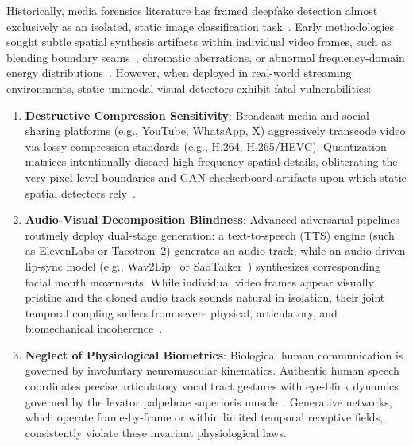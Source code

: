 \documentclass[journal]{IEEEtran}
\begin{document}
Historically, media forensics literature has framed deepfake detection almost exclusively as an isolated, static image classification task~\cite{afchar2018mesonet, chollet2017xception}. Early methodologies sought subtle spatial synthesis artifacts within individual video frames, such as blending boundary seams~\cite{chen2024npr}, chromatic aberrations, or abnormal frequency-domain energy distributions~\cite{frank2020leveraging, durall2020watch}. However, when deployed in real-world streaming environments, static unimodal visual detectors exhibit fatal vulnerabilities:
\begin{enumerate}
    \item \textbf{Destructive Compression Sensitivity}: Broadcast media and social sharing platforms (e.g., YouTube, WhatsApp, X) aggressively transcode video via lossy compression standards (e.g., H.264, H.265/HEVC). Quantization matrices intentionally discard high-frequency spatial details, obliterating the very pixel-level boundaries and GAN checkerboard artifacts upon which static spatial detectors rely~\cite{rossler2019faceforensics}.
    \item \textbf{Audio-Visual Decomposition Blindness}: Advanced adversarial pipelines routinely deploy dual-stage generation: a text-to-speech (TTS) engine (such as ElevenLabs or Tacotron~2) generates an audio track, while an audio-driven lip-sync model (e.g., Wav2Lip~\cite{prajwal2020lip} or SadTalker~\cite{zhang2023sadtalker}) synthesizes corresponding facial mouth movements. While individual video frames appear visually pristine and the cloned audio track sounds natural in isolation, their joint temporal coupling suffers from severe physical, articulatory, and biomechanical incoherence~\cite{khalid2021fakeavceleb}.
    \item \textbf{Neglect of Physiological Biometrics}: Biological human communication is governed by involuntary neuromuscular kinematics. Authentic human speech coordinates precise articulatory vocal tract gestures with eye-blink dynamics governed by the levator palpebrae superioris muscle~\cite{li2018ictu}. Generative networks, which operate frame-by-frame or within limited temporal receptive fields, consistently violate these invariant physiological laws.
\end{enumerate}
\end{document}
